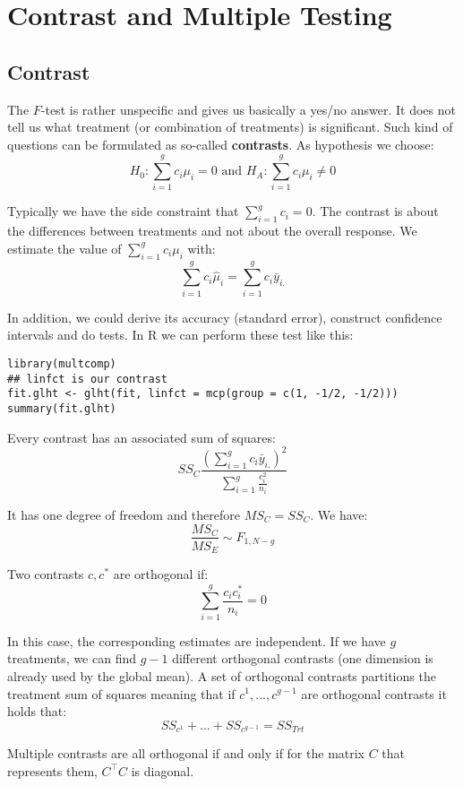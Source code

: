 \section{Contrast and Multiple Testing}

\subsection{Contrast}

The $F$-test is rather unspecific and gives us basically a yes/no answer. It does not tell us what treatment (or combination of treatments) is significant. Such kind of questions can be formulated as so-called \textbf{contrasts}. As hypothesis we choose:
$$H_0 : \sum_{i=1}^g c_i \mu_i = 0 \text{ and } H_A : \sum_{i=1}^g c_i \mu_i \neq 0$$

Typically we have the side constraint that $\sum_{i=1}^g c_i = 0$. The contrast is about the differences between treatments and not about the overall response. We estimate the value of $\sum_{i=1}^g c_i \mu_i$ with:
$$\sum_{i=1}^g c_i \hat \mu_i = \sum_{i=1}^g c_i \bar y_{i.}$$

In addition, we could derive its accuracy (standard error), construct confidence intervals and do tests. In R we can perform these test like this:

\begin{lstlisting}
library(multcomp)
## linfct is our contrast
fit.glht <- glht(fit, linfct = mcp(group = c(1, -1/2, -1/2)))
summary(fit.glht)
\end{lstlisting}

Every contrast has an associated sum of squares:
$$SS_C \frac{(\sum_{i=1}^g c_i \bar y_{i.})^2}{\sum_{i=1}^g \frac{c_i^2}{n_i}}$$	

It has one degree of freedom and therefore $MS_C = SS_C$. We have:
$$\frac{MS_C}{MS_E} \sim F_{1, N-g}$$

Two contrasts $c, c^*$ are orthogonal if:
$$\sum_{i=1}^g \frac{c_i c_i^*}{n_i} = 0$$

In this case, the corresponding estimates are independent. If we have $g$ treatments, we can find
$g - 1$ different orthogonal contrasts (one dimension is already used by the global mean). A set of orthogonal contrasts partitions the treatment sum of squares meaning that if
$c^1, ..., c^{g-1}$ are orthogonal contrasts it holds that:
$$SS_{c^1} + ... + SS_{c^{g-1}} = SS_{Trt}$$

Multiple contrasts are all orthogonal if and only if for the matrix $C$ that represents them, $C^\top C$ is diagonal.


